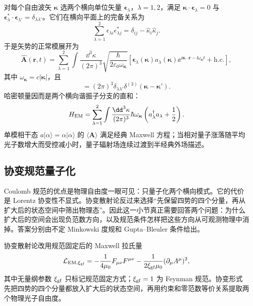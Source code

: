 对每个自由波矢 $\boldsymbol\kappa$ 选两个横向单位矢量 $\boldsymbol\epsilon_\lambda$，$\lambda=1,2$，满足 $\boldsymbol\kappa\cdot\boldsymbol\epsilon_\lambda=0$ 与 $\boldsymbol\epsilon_\lambda^*\cdot\boldsymbol\epsilon_{\lambda'}=\delta_{\lambda\lambda'}$。它们在横向平面上的完备关系为
\begin{equation*}
\sum_{\lambda=1}^2\epsilon_{\lambda i}\epsilon_{\lambda j}^*
=\delta_{ij}-\hat\kappa_i\hat\kappa_j.
\end{equation*}
于是矢势的正常模展开为
\begin{equation}
\boxed{
\hat{\mathbf A}(\mathbf r,t)
=\sum_{\lambda=1}^2\int\frac{\dd^3 \kappa}{(2\pi)^3}
\sqrt{\frac{\hbar}{2\varepsilon_0\omega_{\boldsymbol\kappa}}}
\left[
\boldsymbol\epsilon_\lambda(\boldsymbol\kappa)a_\lambda(\boldsymbol\kappa)
 \ee^{i\boldsymbol\kappa\cdot\mathbf r-\ii\omega_{\boldsymbol\kappa}t}
+\mathrm{h.c.}\right],}
\label{eq:maxwell-mode-r2}
\end{equation}
其中 $\omega_{\boldsymbol\kappa}=c|\boldsymbol\kappa|$，且
\begin{equation*}
[a_\lambda(\boldsymbol\kappa),a_{\lambda'}^\dagger(\boldsymbol\kappa')]
=(2\pi)^3\delta_{\lambda\lambda'}\delta^{(3)}(\boldsymbol\kappa-\boldsymbol\kappa').
\end{equation*}
哈密顿量因而是两个横向谐振子分支的直和：
\begin{equation*}
H_{\rm EM}
=\sum_{\lambda=1}^2\int\frac{\dd^3 \kappa}{(2\pi)^3}
\hbar\omega_{\boldsymbol\kappa}
\left(a_\lambda^\dagger a_\lambda+\frac12\right).
\end{equation*}
单模相干态 $a|\alpha\rangle=\alpha|\alpha\rangle$ 的 $\langle\mathbf A\rangle$ 满足经典 Maxwell 方程；当相对量子涨落随平均光子数增大而受控减小时，量子辐射场连续过渡到半经典外场描述。



\subsection{协变规范量子化}

Coulomb 规范的优点是物理自由度一眼可见：只量子化两个横向模式。它的代价是 Lorentz 协变性不显式。协变散射论反过来选择“先保留四势的四个分量，再从扩大后的状态空间中筛出物理态”。因此这一小节真正需要回答两个问题：为什么扩大后的空间会出现负范数方向，以及规范条件怎样把这些方向从可观测物理中消掉。答案分别由不定 Minkowski 度规和 Gupta--Bleuler 条件给出。

协变散射论改用规范固定后的 Maxwell 拉氏量
\begin{equation}
 \mathcal L_{\rm EM,\xi_{\rm gf}}
 =-\frac1{4\mu_0}F_{\mu\nu}F^{\mu\nu}
 -\frac1{2\xi_{\rm gf}\mu_0}(\partial_\mu A^\mu)^2,
 \label{eq:cov-gauge-lagrangian-r2}
\end{equation}
其中无量纲参数 $\xi_{\rm gf}$ 只标记规范固定方式；$\xi_{\rm gf}=1$ 为 Feynman 规范。协变形式先把四势的四个分量都放入扩大后的状态空间，再用约束和零范数等价关系提取两个物理光子自由度。

